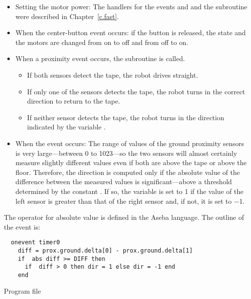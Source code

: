 
\begin{itemize}

\item Setting the motor power: The handlers for the events
 and  and the subroutine
 were described in Chapter~\ref{c.fast}.

\item When the center-button event occurs: if the button is released,
the state and the motors are changed from on to off and from off to on.

\item When a proximity event occurs, the subroutine  is called.
\begin{itemize}
\item If both sensors detect the tape, the robot drives straight.
\item If only one of the sensors detects the tape, the robot turns in
the correct direction to return to the tape.
\item If neither sensor detects the tape, the robot turns in the
direction indicated by the variable .
\end{itemize}

\item When the  event occurs: The range of values of the
ground proximity sensors is very large---between 0 to 1023---so the two
sensors will almost certainly measure slightly different values even if
both are above the tape or above the floor. Therefore, the direction is
computed only if the absolute value of the difference between the
measured values is significant---above a threshold determined by the
constant . If so, the variable  is set to 1 if the value
of the left sensor is greater than that of the right sensor and, if not,
it is set to $-$1.

\end{itemize}


The operator for absolute value is defined in the Aseba language. The
outline of the  event is:
\begin{verbatim}
  onevent timer0
    diff = prox.ground.delta[0] - prox.ground.delta[1]
    if  abs diff >= DIFF then
      if  diff > 0 then dir = 1 else dir = -1 end
    end
  \end{verbatim}

{\raggedleft \hfill Program file }

